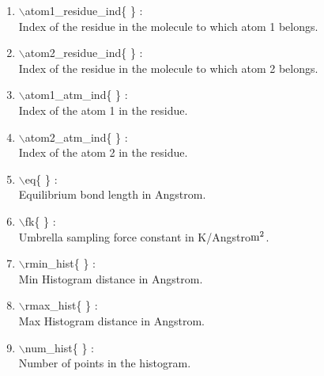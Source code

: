 \documentclass[12pt]{article}
\begin{document}
\begin{itemize}
\begin{enumerate}
 \vspace{0.15in} \Large
 \item  $\backslash$atom1\_residue\_ind\{ \} : \\ 
    \large
    Index of the residue in the molecule to which atom 1 belongs.

 \vspace{0.15in} \Large
 \item  $\backslash$atom2\_residue\_ind\{ \} : \\ 
    \large
    Index of the residue in the molecule to which atom 2 belongs.

 \vspace{0.15in} \Large
 \item  $\backslash$atom1\_atm\_ind\{ \} : \\    
    \large
    Index of the atom 1 in the residue.
 
 \vspace{0.15in} \Large
 \item  $\backslash$atom2\_atm\_ind\{ \} : \\     
    \large
    Index of the atom 2 in the residue.
 
 \vspace{0.15in} \Large
 \item  $\backslash$eq\{ \} : \\               
    \large
    Equilibrium bond length in Angstrom.
  
 \vspace{0.15in} \Large
 \item  $\backslash$fk\{ \} : \\               
    \large
    Umbrella sampling force constant in K/Angstro${\rm m}^2$.

 \vspace{0.15in} \Large
 \item  $\backslash$rmin\_hist\{ \} : \\         
    \large
    Min Histogram distance in Angstrom.

 \vspace{0.15in} \Large
 \item  $\backslash$rmax\_hist\{ \} : \\         
    \large
    Max Histogram distance in Angstrom.

 \vspace{0.15in} \Large
 \item  $\backslash$num\_hist\{ \} : \\         
    \large
    Number of points in the histogram.
 

\end{enumerate}
\end{itemize}
\end{document}
